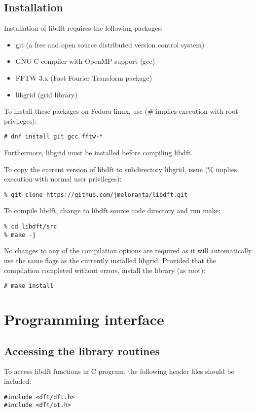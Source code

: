 \documentclass[12pt,letterpaper]{report}
\begin{document}
\section{Installation}

Installation of libdft requires the following packages:
\begin{itemize}
\item git (a free and open source distributed version control system)
\item GNU C compiler with OpenMP support (gcc)
\item FFTW 3.x (Fast Fourier Transform package)
\item libgrid (grid library)
\end{itemize}
To install these packages on Fedora linux, use (\# implies execution with root privileges): 
\begin{verbatim}
# dnf install git gcc fftw-*
\end{verbatim}
Furthermore, libgrid must be installed before compiling libdft.

To copy the current version of libdft to subdirectory libgrid, issue 
(\% implies execution with normal user privileges):
\begin{verbatim}
% git clone https://github.com/jmeloranta/libdft.git
\end{verbatim}
To compile libdft, change to libdft source code directory and run make:
\begin{verbatim}
% cd libdft/src
% make -j
\end{verbatim}
No changes to any of the compilation options are required as it will 
automatically use the same flags as the currently installed libgrid.
Provided that the compilation completed without errors, install the library 
(as root):
\begin{verbatim}
# make install
\end{verbatim}

\chapter{Programming interface}

\section{Accessing the library routines}

To access libdft functions in C program, the following header files should be 
included:
\begin{verbatim}
#include <dft/dft.h>
#include <dft/ot.h>
\end{verbatim}
\end{document}
